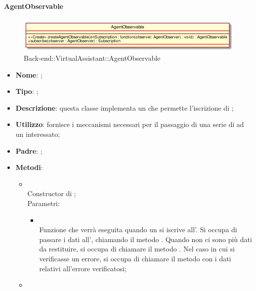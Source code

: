 \hypertarget{AgentObservable_label}{\paragraph{AgentObservable}}
\begin{figure}[h]
	\centering
	\includegraphics[width=\textwidth,height=\textheight,keepaspectratio]{images/ClassAgentObservable.png}
	\caption{Back-end::VirtualAssistant::AgentObservable}
\end{figure}
\begin{itemize}
	\item \textbf{Nome}: ;
	\item \textbf{Tipo}: ;
	\item \textbf{Descrizione}: questa classe implementa un  che permette l'iscrizione di ;
	\item \textbf{Utilizzo}: fornisce i meccanismi necessari per il passaggio di una serie di  ad un  interessato;
	\item \textbf{Padre}: ;
	\item \textbf{Metodi}:
	\begin{itemize}
		\item[]  \\
		Constructor di ;\\
		Parametri:
		\begin{itemize}
			\item {} \\
			Funzione che verrà eseguita quando un  si iscrive all'. Si occupa di passare i dati all', chiamando il metodo . Quando non ci sono più dati da restituire, si occupa di chiamare il metodo . Nel caso in cui si verificasse un errore, si occupa di chiamare il metodo  con i dati relativi all'errore verificatosi;
		\end{itemize}
		\item[]  \\

\end{itemize}
\end{itemize}
